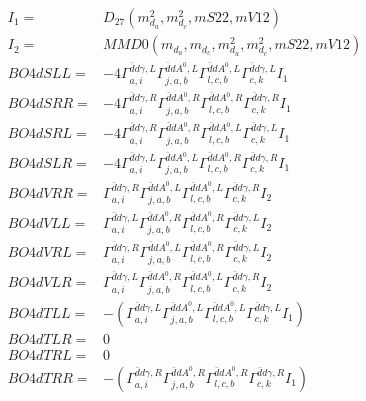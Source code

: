 \documentclass[A4,landscape]{article}
\begin{document}
\begin{align} 
I_1 = & D_{27}(m^2_{d_{{a}}}, m^2_{d_{{c}}}, mS22, mV12) \\ 
I_2 = & MMD0(m_{d_{{a}}}, m_{d_{{c}}}, m^2_{d_{{a}}}, m^2_{d_{{c}}}, mS22, mV12) \\ 
  BO4dSLL= & -4  \Gamma^{\bar{d}d \gamma ,L}_{a, i} \Gamma^{\bar{d}d A^0 ,L}_{j, a, b} \Gamma^{\bar{d}d A^0 ,L}_{l, c, b} \Gamma^{\bar{d}d \gamma ,L}_{c, k} I_1 \\ 
  BO4dSRR= & -4  \Gamma^{\bar{d}d \gamma ,R}_{a, i} \Gamma^{\bar{d}d A^0 ,R}_{j, a, b} \Gamma^{\bar{d}d A^0 ,R}_{l, c, b} \Gamma^{\bar{d}d \gamma ,R}_{c, k} I_1 \\ 
  BO4dSRL= & -4  \Gamma^{\bar{d}d \gamma ,R}_{a, i} \Gamma^{\bar{d}d A^0 ,R}_{j, a, b} \Gamma^{\bar{d}d A^0 ,L}_{l, c, b} \Gamma^{\bar{d}d \gamma ,L}_{c, k} I_1 \\ 
  BO4dSLR= & -4  \Gamma^{\bar{d}d \gamma ,L}_{a, i} \Gamma^{\bar{d}d A^0 ,L}_{j, a, b} \Gamma^{\bar{d}d A^0 ,R}_{l, c, b} \Gamma^{\bar{d}d \gamma ,R}_{c, k} I_1 \\ 
  BO4dVRR= &  \Gamma^{\bar{d}d \gamma ,R}_{a, i} \Gamma^{\bar{d}d A^0 ,L}_{j, a, b} \Gamma^{\bar{d}d A^0 ,L}_{l, c, b} \Gamma^{\bar{d}d \gamma ,R}_{c, k} I_2 \\ 
  BO4dVLL= &  \Gamma^{\bar{d}d \gamma ,L}_{a, i} \Gamma^{\bar{d}d A^0 ,R}_{j, a, b} \Gamma^{\bar{d}d A^0 ,R}_{l, c, b} \Gamma^{\bar{d}d \gamma ,L}_{c, k} I_2 \\ 
  BO4dVRL= &  \Gamma^{\bar{d}d \gamma ,R}_{a, i} \Gamma^{\bar{d}d A^0 ,L}_{j, a, b} \Gamma^{\bar{d}d A^0 ,R}_{l, c, b} \Gamma^{\bar{d}d \gamma ,L}_{c, k} I_2 \\ 
  BO4dVLR= &  \Gamma^{\bar{d}d \gamma ,L}_{a, i} \Gamma^{\bar{d}d A^0 ,R}_{j, a, b} \Gamma^{\bar{d}d A^0 ,L}_{l, c, b} \Gamma^{\bar{d}d \gamma ,R}_{c, k} I_2 \\ 
  BO4dTLL= & -( \Gamma^{\bar{d}d \gamma ,L}_{a, i} \Gamma^{\bar{d}d A^0 ,L}_{j, a, b} \Gamma^{\bar{d}d A^0 ,L}_{l, c, b} \Gamma^{\bar{d}d \gamma ,L}_{c, k} I_1) \\ 
  BO4dTLR= & 0 \\ 
  BO4dTRL= & 0 \\ 
  BO4dTRR= & -( \Gamma^{\bar{d}d \gamma ,R}_{a, i} \Gamma^{\bar{d}d A^0 ,R}_{j, a, b} \Gamma^{\bar{d}d A^0 ,R}_{l, c, b} \Gamma^{\bar{d}d \gamma ,R}_{c, k} I_1) \\ 
\end{align} 
\end{document}
